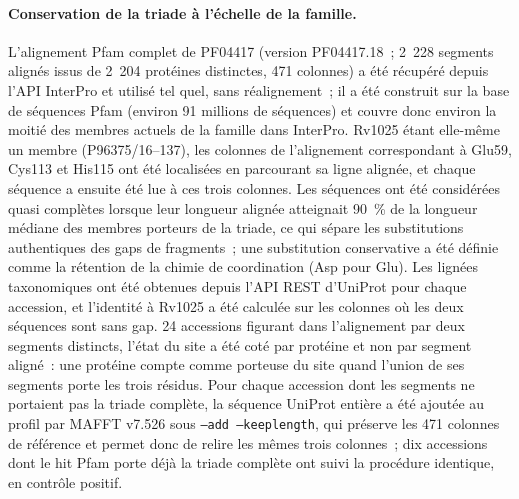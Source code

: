 \documentclass[11pt,a4paper]{article}
\begin{document}
\paragraph{Conservation de la triade à l'échelle de la famille.} L'alignement Pfam complet de PF04417 (version PF04417.18~; 2~228 segments alignés issus de 2~204 protéines distinctes, 471 colonnes) a été récupéré depuis l'API InterPro et utilisé tel quel, sans réalignement~; il a été construit sur la base de séquences Pfam (environ 91 millions de séquences) et couvre donc environ la moitié des membres actuels de la famille dans InterPro. Rv1025 étant elle-même un membre (P96375/16--137), les colonnes de l'alignement correspondant à Glu59, Cys113 et His115 ont été localisées en parcourant sa ligne alignée, et chaque séquence a ensuite été lue à ces trois colonnes. Les séquences ont été considérées quasi complètes lorsque leur longueur alignée atteignait 90~\% de la longueur médiane des membres porteurs de la triade, ce qui sépare les substitutions authentiques des gaps de fragments~; une substitution conservative a été définie comme la rétention de la chimie de coordination (Asp pour Glu). Les lignées taxonomiques ont été obtenues depuis l'API REST d'UniProt pour chaque accession, et l'identité à Rv1025 a été calculée sur les colonnes où les deux séquences sont sans gap. 24 accessions figurant dans l'alignement par deux segments distincts, l'état du site a été coté par protéine et non par segment aligné~: une protéine compte comme porteuse du site quand l'union de ses segments porte les trois résidus. Pour chaque accession dont les segments ne portaient pas la triade complète, la séquence UniProt entière a été ajoutée au profil par MAFFT v7.526 \citep{katoh2013mafft} sous \texttt{--add --keeplength}, qui préserve les 471 colonnes de référence et permet donc de relire les mêmes trois colonnes~; dix accessions dont le hit Pfam porte déjà la triade complète ont suivi la procédure identique, en contrôle positif.
\end{document}
